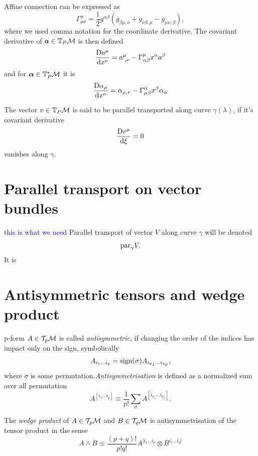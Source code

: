 Affine connection can be expressed as
\begin{equation}
    \Gamma^{\alpha}_{\mu\nu} = \frac{1}{2}g^{\alpha \beta}\left(g_{\beta\mu,\nu}+g_{\nu\beta,\mu}-g_{\mu\nu,\beta}\right),
\end{equation}
where we used comma notation for the coordinate derivative.
The covariant derivative of $\bm a\in \mathbb{T}_P\mathcal{M}$ is then defined
\begin{equation}
    \frac{\mathrm{D} a^\mu}{\mathrm{d} x^\nu}=a_{\;,\nu}^\mu-\Gamma^\mu_{\alpha\beta} x^\alpha a^\beta 
\end{equation}
and for $\bm\alpha\in \mathbb{T}_P^*\mathcal{M}$ it is
\begin{equation}
    \frac{\mathrm{D} \alpha_\mu}{\mathrm{d} x^\nu}=\alpha_{\mu,\nu}-\Gamma^\alpha_{\mu\beta}x^\beta \alpha_\alpha 
\end{equation}

The vector $v\in \mathbb{T}_P\mathcal{M}$ is said to be parallel transported along curve $\gamma(\lambda)$, if it's covariant derivative
\begin{equation}
    \frac{\mathrm{D} v^\mu}{\mathrm{d} \xi}=0
\end{equation}
vanishes along $\gamma$.

\section{Parallel transport on vector bundles}
\textcolor{blue}{this is what we need}
Parallel transport of vector $V$ along curve $\gamma$ will be denoted
$$\textrm{par}_\gamma V.$$
It is 


\section{Antisymmetric tensors and wedge product}
p-form $A\in \mathcal{T}_p \mathcal{M}$ is called \emph{antisymmetric}, if changing the order of the indices has impact only on the sign, symbolically
$$A_{i_1\dots i_p} = \operatorname{\textrm{sign}}(\sigma)A_{i_{\sigma_1}\dots i_{\sigma_p}},$$
where $\sigma$ is some permutation.\emph{Antisymmetrisation} is defined as a normalized sum over all permutation
\begin{equation}
    A^{[i_1\dots i_p]}\equiv \frac{1}{p!}\sum_\sigma A^{[i_{\sigma_1}\dots i_{\sigma_p}]}. 
\end{equation}

The \emph{wedge product} of $A\in \mathcal{T}_p \mathcal{M}$ and $B\in \mathcal{T}_q \mathcal{M}$ is antisymmetrisation of the tensor product in the sense
\begin{equation}
    A\wedge B\equiv \frac{(p+q)!}{p!q!} A^{[i_1\dots i_p}\otimes B^{i_1\dots i_q]}
\end{equation}



